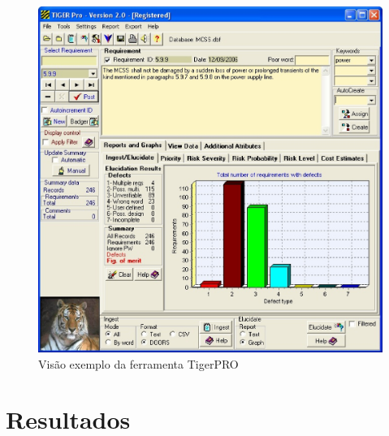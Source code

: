 \begin{figure}[!htpb]
\centering
\includegraphics[scale=0.4]{figuras/ferramentas/tigerpro}
\caption{Visão exemplo da ferramenta TigerPRO}
\end{figure}
\newpage
\section{Resultados}


